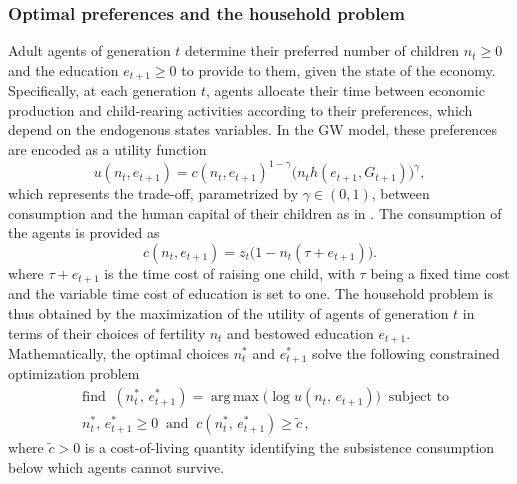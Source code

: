 \documentclass[a4paper,fleqn]{cas-sc}
\DeclareMathOperator*{\argmax}{\arg\,max}
\begin{document}
\subsubsection{Optimal preferences and the household problem}\label{subsubsec:household_problem}
Adult agents of generation $t$ determine their preferred number of children $n_t\geq 0$ and the education $e_{t+1}\geq 0$ to provide to them, given the state of the economy.
Specifically, at each generation $t$, agents allocate their time between economic production and child-rearing activities according to their preferences, which depend on the endogenous states variables.
In the GW model, these preferences are encoded as a utility function
%
\begin{equation}\label{eq:utility_function} 
    u(n_t,e_{t+1}) = c(n_t,e_{t+1})^{1-\gamma} \big(n_t h(e_{t+1},G_{t+1})\big)^{\gamma}, 
\end{equation} 
%
which represents the trade-off, parametrized by $\gamma \in (0, 1)$, between consumption and the human capital of their children as in \cite{Galor2011}.
The consumption of the agents is provided as 
\begin{equation}\label{eq:consumption_normalized} 
    c(n_t,e_{t+1}) = z_t \big(1-n_t(\tau+e_{t+1})\big). 
\end{equation}
%
where $\tau + e_{t+1}$ is the time cost of raising one child, with $\tau$ being a fixed time cost and the variable time cost of education is set to one. 
The household problem is thus obtained by the maximization of the utility of agents of generation $t$ in terms of their choices of fertility $n_t$ and bestowed education $e_{t+1}$. 
Mathematically, the optimal choices $n_t^*$ and $e^*_{t+1}$ solve the following constrained optimization problem
%
\begin{align}\label{eq:optimization_problem}
     &\text{find}\;\;(n_t^*,\,e_{t+1}^*) = \argmax\!\big(\log u(n_t,\,e_{t+1})\big)\;\;\text{subject to}\nonumber\\
     &n_t^*,\,e_{t+1}^*\geq0\;\;\text{and}\;\;c(n_t^*,\,e_{t+1}^*)\geq\tilde{c}\,,
\end{align}
%
where $\tilde{c}>0$ is a cost-of-living quantity identifying the subsistence consumption below which agents cannot survive.
\end{document}
